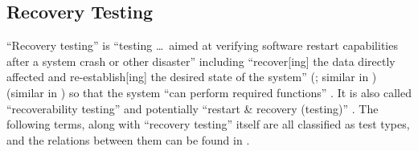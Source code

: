 \subsection{Recovery Testing}
\label{recov-discrep}

``Recovery testing'' is ``testing \dots\ aimed at verifying
software restart capabilities after a system crash or other disaster''
\citep[p.~5-9]{SWEBOK2024} including ``recover[ing] the data directly affected
and re-establish[ing] the desired state of the system''
\ifnotpaper
    (\citealp{ISO_IEC2023a}; similar in \citealp[p.~7-10]{SWEBOK2024})
\else
    \cite{ISO_IEC2023a} (similar in \cite[p.~7-10]{SWEBOK2024})
\fi
so that the system ``can perform required functions'' \citep[p.~370]{IEEE2017}.
It is also called ``recoverability testing'' \cite[p.~47]{Kam2008} and
potentially ``restart \& recovery (testing)'' \cite[Fig.~5]{Gerrard2000a}.
The following terms, along with ``recovery testing'' itself
\citep[p.~22]{IEEE2022} are all classified as test types, and the relations
between them can be found in .

